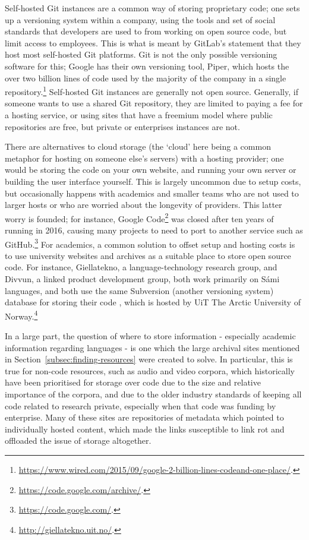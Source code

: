 Self-hosted Git instances are a common way of storing proprietary code; one sets up a versioning system within a company, using the tools and set of social standards that developers are used to from working on open source code, but limit access to employees. This is what is meant by GitLab's statement that they host most self-hosted Git platforms. Git is not the only possible versioning software for this; Google has their own versioning tool, Piper, which hosts the over two billion lines of code used by the majority of the company in a single repository.\footnote{\href{https://www.wired.com/2015/09/google-2-billion-lines-codeand-one-place/}{https://www.wired.com/2015/09/google-2-billion-lines-codeand-one-place/}. } Self-hosted Git instances are generally not open source. Generally, if someone wants to use a shared Git repository, they are limited to paying a fee for a hosting service, or using sites that have a freemium model where public repositories are free, but private or enterprises instances are not.

There are alternatives to cloud storage (the `cloud' here being a common metaphor for hosting on someone else's servers) with a hosting provider; one would be storing the code on your own website, and running your own server or building the user interface yourself. This is largely uncommon due to setup costs, but occasionally happens with academics and smaller teams who are not used to larger hosts or who are worried about the longevity of providers. This latter worry is founded; for instance, Google Code\footnote{\href{https://code.google.com/archive/}{https://code.google.com/archive/}. } was closed after ten years of running in 2016, causing many projects to need to port to another service such as GitHub.\footnote{\href{https://code.google.com/}{https://code.google.com/}. } For academics, a common solution to offset setup and hosting costs is to use university websites and archives as a suitable place to store open source code. For instance, Giellatekno, a language-technology research group, and Divvun, a linked product development group, both work primarily on S\'ami languages, and both use the same Subversion (another versioning system) database for storing their code \citep{moshagenopen}, which is hosted by UiT The Arctic University of Norway.\footnote{\href{http://giellatekno.uit.no/}{http://giellatekno.uit.no/}. }

In a large part, the question of where to store information - especially academic information regarding languages - is one which the large archival sites mentioned in Section~\ref{subsec:finding-resources} were created to solve. In particular, this is true for non-code resources, such as audio and video corpora, which historically have been prioritised for storage over code due to the size and relative importance of the corpora, and due to the older industry standards of keeping all code related to research private, especially when that code was funding by enterprise. Many of these sites are repositories of metadata which pointed to individually hosted content, which made the links susceptible to link rot and offloaded the issue of storage altogether.

